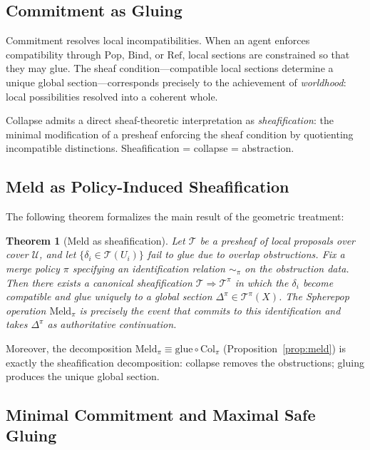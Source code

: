 \documentclass[12pt, a4paper]{article}
\newtheorem{theorem}{Theorem}[section]
\theoremstyle{definition}
\theoremstyle{remark}
\newcommand{\Pop}{\mathrm{Pop}}
\newcommand{\Refuse}{\mathrm{Ref}}
\newcommand{\Bind}{\mathrm{Bind}}
\newcommand{\Collapse}{\mathrm{Col}}
\newcommand{\Meld}{\mathrm{Meld}}
\begin{document}
\subsection{Commitment as Gluing}

Commitment resolves local incompatibilities. When an agent enforces compatibility
through $\Pop$, $\Bind$, or $\Refuse$, local sections are constrained so that they
may glue. The sheaf condition—compatible local sections determine a unique global
section—corresponds precisely to the achievement of \emph{worldhood}: local
possibilities resolved into a coherent whole.

Collapse admits a direct sheaf-theoretic interpretation as \emph{sheafification}: the
minimal modification of a presheaf enforcing the sheaf condition by quotienting
incompatible distinctions. Sheafification = collapse = abstraction.

\subsection{Meld as Policy-Induced Sheafification}

The following theorem formalizes the main result of the geometric treatment:

\begin{theorem}[Meld as sheafification]
\label{thm:meld-sheaf}
Let $\mathcal{T}$ be a presheaf of local proposals over cover $\mathcal{U}$, and let
$\{\delta_i \in \mathcal{T}(U_i)\}$ fail to glue due to overlap obstructions. Fix a
merge policy $\pi$ specifying an identification relation $\sim_\pi$ on the obstruction
data. Then there exists a canonical sheafification
$\mathcal{T} \Rightarrow \mathcal{T}^\pi$
in which the $\delta_i$ become compatible and glue uniquely to a global section
$\Delta^\pi \in \mathcal{T}^\pi(X)$. The Spherepop operation $\Meld_\pi$ is precisely
the event that commits to this identification and takes $\Delta^\pi$ as authoritative
continuation.
\end{theorem}

Moreover, the decomposition $\Meld_\pi \equiv \mathrm{glue} \circ \Collapse_\pi$
(Proposition~\ref{prop:meld}) is exactly the sheafification decomposition: collapse
removes the obstructions; gluing produces the unique global section.

\subsection{Minimal Commitment and Maximal Safe Gluing}
\end{document}
